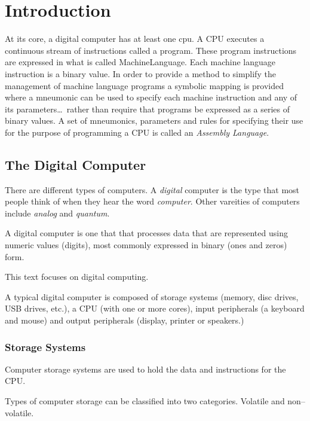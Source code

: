 \chapter{Introduction}
\label{chapter:Introduction}

At its core, a digital computer has at least one \acrfull{cpu}.  A
CPU executes a continuous stream of instructions called a \gls{program}.  
These program instructions are expressed in what is called 
\gls{MachineLanguage}.  Each machine language instruction is a binary value.  
In order to provide a method to simplify the management of machine language 
programs a symbolic mapping is provided where a \gls{mneumonic} can be used to 
specify each machine instruction and any of its parameters\ldots\ rather 
than require that programs be expressed as a series of binary values.  
A set of mneumonics, parameters and rules for specifying their use for
the purpose of programming a CPU is called an {\em Assembly Language}.

\section{The Digital Computer}

There are different types of computers.  A {\em digital} computer is
the type that most people think of when they hear the word {\em computer}.
Other vareities of computers include {\em analog} and {\em quantum}.

A digital computer is one that that processes data that are represented
using numeric values (digits), most commonly expressed in binary
(ones and zeros) form.

This text focuses on digital computing.

A typical digital computer is composed of storage systems (memory, disc 
drives, USB drives, etc.), a CPU (with one or more cores), input peripherals 
(a keyboard and mouse) and output peripherals (display, printer or speakers.)

\subsection{Storage Systems}

Computer storage systems are used to hold the data and instructions
for the CPU.

Types of computer storage can be classified into two categories.
Volatile and non--volatile.

